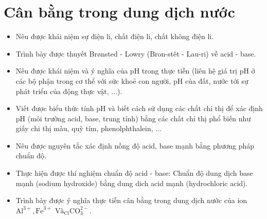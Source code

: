 \section{Cân bằng trong dung dịch nước}
\begin{Muctieu}
	\begin{itemize}
		\item  Nêu được khái niệm sự điện li, chất điện li, chất không điện li.
		\item  Trình bày được thuyết Brønsted - Lowry (Bron-stêt - Lau-ri) về acid - base.
		\item  Nêu được khái niệm và ý nghĩa của pH trong thực tiễn (liên hệ giá trị pH ở các bộ phận trong cơ thể với sức khoẻ con người, pH của đất, nước tới sự phát triển của động thực vật, ...).
		\item  Viết được biểu thức tính pH và biết cách sử dụng các chất chỉ thị để xác định pH (môi trường acid, base, trung tính) bẳng các chất chỉ thị phổ biến như giấy chi thị màu, quỳ tím, phenolphthalein, ...
		\item  Nêu được nguyên tắc xác định nồng độ acid, base mạnh bằng phương pháp chuẩn độ.
		\item  Thực hiện được thí nghiệm chuẩn độ acid - base: Chuẩn độ dung dịch base mạnh (sodium hydroxide) bằng dung dich acid mạnh (hydrochloric acid).
		\item  Trình bày được ý nghĩa thực tiễn cân bằng trong dung dịch nước của ion $\mathrm{Al}^{3+}, \mathrm{Fe}^{3+}$ $\mathrm{Và}_{\mathrm{Cl}} \mathrm{CO}_3^{2-}$.
	\end{itemize}
\end{Muctieu}
